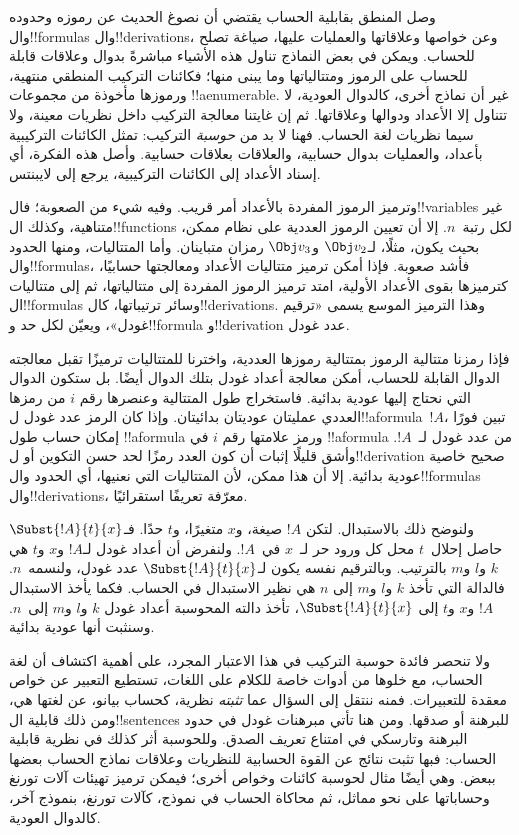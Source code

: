 \documentclass[../../../include/open-logic-section]{subfiles}
\begin{document}

وصل المنطق بقابلية الحساب يقتضي أن نصوغ الحديث
عن رموزه وحدوده وال!!{formula}s وال!!{derivation}s،
وعن خواصها وعلاقاتها والعمليات عليها، صياغة تصلح
للحساب. ويمكن في بعض النماذج تناول هذه الأشياء
مباشرةً بدوال وعلاقات قابلة للحساب على الرموز
ومتتالياتها وما يبنى منها؛ فكائنات التركيب
المنطقي منتهية، ورموزها مأخوذة من مجموعات
!!a{enumerable}. غير أن نماذج أخرى، كالدوال
العودية، لا تتناول إلا الأعداد ودوالها وعلاقاتها.
ثم إن غايتنا معالجة التركيب داخل نظريات معينة،
ولا سيما نظريات لغة الحساب. فهنا لا بد من
\emph{حوسبة} التركيب: تمثل الكائنات التركيبية
بأعداد، والعمليات بدوال حسابية، والعلاقات
بعلاقات حسابية. وأصل هذه الفكرة، أي إسناد
الأعداد إلى الكائنات التركيبية، يرجع إلى لايبنتس.

وترميز الرموز المفردة بالأعداد أمر قريب.
وفيه شيء من الصعوبة؛ فال!!{variable}s غير
متناهية، وكذلك ال!!{function}s لكل رتبة~$n$.
إلا أن تعيين الرموز العددية على نظام ممكن،
بحيث يكون، مثلًا، لـ$\Obj v_2$ و$\Obj v_3$
رمزان متباينان. وأما المتتاليات، ومنها الحدود
وال!!{formula}s، فأشد صعوبة. فإذا أمكن
ترميز متتاليات الأعداد ومعالجتها حسابيًا،
كترميزها بقوى الأعداد الأولية، امتد ترميز
الرموز المفردة إلى متتالياتها، ثم إلى
متتاليات ال!!{formula}s وسائر ترتيباتها،
كال!!{derivation}s. وهذا الترميز الموسع
يسمى «ترقيم غودل»، ويعيّن لكل حد
و!!{formula} و!!{derivation} عدد غودل.

فإذا رمزنا متتالية الرموز بمتتالية رموزها العددية،
واخترنا للمتتاليات ترميزًا تقبل معالجته الدوال
القابلة للحساب، أمكن معالجة أعداد غودل
بتلك الدوال أيضًا. بل ستكون الدوال التي
نحتاج إليها عودية بدائية. فاستخراج طول
المتتالية وعنصرها رقم $i$ من رمزها العددي
عمليتان عوديتان بدائيتان. وإذا كان الرمز
عدد غودل ل!!a{formula}~$!A$، تبين فورًا
إمكان حساب طول !!a{formula} ورمز علامتها
رقم $i$ في !!a{formula} من عدد غودل لـ~$!A$.
وأشق قليلًا إثبات أن كون العدد رمزًا لحد
حسن التكوين أو ل!!{derivation} صحيح خاصية
عودية بدائية. إلا أن هذا ممكن، لأن
المتتاليات التي نعنيها، أي الحدود
وال!!{formula}s وال!!{derivation}s،
معرّفة تعريفًا استقرائيًا.

ولنوضح ذلك بالاستبدال. لتكن $!A$ صيغة،
و$x$ متغيرًا، و$t$ حدًا. فـ$\Subst{!A}{t}{x}$
حاصل إحلال~$t$ محل كل ورود حر لـ~$x$
في~$!A$. ولنفرض أن أعداد غودل لـ$!A$
و$x$ و$t$ هي $k$ و$l$ و$m$ بالترتيب.
وبالترقيم نفسه يكون لـ$\Subst{!A}{t}{x}$
عدد غودل، ولنسمه~$n$. فالدالة التي تأخذ
$k$ و$l$ و$m$ إلى $n$ هي نظير الاستبدال
في الحساب. فكما يأخذ الاستبدال $!A$
و$x$ و$t$ إلى $\Subst{!A}{t}{x}$،
تأخذ دالته المحوسبة أعداد غودل $k$
و$l$ و$m$ إلى~$n$. وسنثبت أنها عودية بدائية.

ولا تنحصر فائدة حوسبة التركيب في هذا الاعتبار
المجرد، على أهمية اكتشاف أن لغة الحساب،
مع خلوها من أدوات خاصة للكلام على اللغات،
تستطيع التعبير عن خواص معقدة للتعبيرات.
فمنه ننتقل إلى السؤال عما \emph{تثبته}
نظرية، كحساب بيانو، عن لغتها هي، ومن
ذلك قابلية ال!!{sentence}s للبرهنة أو
صدقها. ومن هنا تأتي مبرهنات غودل في
حدود البرهنة وتارسكي في امتناع تعريف الصدق.
وللحوسبة أثر كذلك في نظرية قابلية الحساب:
فبها تثبت نتائج عن القوة الحسابية للنظريات
وعلاقات نماذج الحساب بعضها ببعض.
وهي أيضًا مثال لحوسبة كائنات وخواص أخرى؛
فيمكن ترميز تهيئات آلات تورنغ وحساباتها
على نحو مماثل، ثم محاكاة الحساب في نموذج،
كآلات تورنغ، بنموذج آخر، كالدوال العودية.
\end{document}
